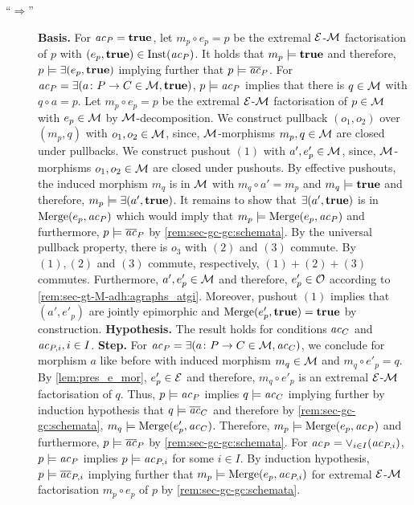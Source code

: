 \begin{description}
    \item[``$\Rightarrow$''] \textbf{Basis.}
    For $\mathit{ac}_P=\textbf{true}$, let $m_p \circ e_p=p$ be the extremal $\mathcal{E}$-${\cal M}$ factorisation of $p$ with $(e_p,\textbf{true}) \in \mathrm{Inst}(\mathit{ac}_P)$.
    It holds that $m_p \models \textbf{true}$ and therefore, $p \models \exists(e_p,\textbf{true})$ implying further that $p \models \overline{\mathit{ac}}_P$.
    For $\mathit{ac}_P=\exists(a\colon P \to C \in {\cal M},\textbf{true})$, $p \models \mathit{ac}_P$ implies that there is $q \in {\cal M}$ with $q \circ a=p$.
    Let $m_p \circ e_p=p$ be the extremal $\mathcal{E}$-${\cal M}$ factorisation of $p \in {\cal M}$ with $e_p \in {\cal M}$ by ${\cal M}$-decomposition.
    We construct pullback $(o_1,o_2)$ over $(m_p,q)$ with $o_1,o_2 \in {\cal M}$, since, ${\cal M}$-morphisms $m_p,q \in {\cal M}$ are closed under pullbacks.
    We construct pushout $(1)$ with $a',e'_p \in {\cal M}$, since, ${\cal M}$-morphisms $o_1,o_2 \in {\cal M}$ are closed under pushouts.
    By effective pushouts, the induced morphism $m_q$ is in ${\cal M}$ with $m_q \circ a'=m_p$ and $m_q \models \textbf{true}$ and therefore, $m_p \models \exists(a',\textbf{true})$.
    It remains to show that $\exists(a',\textbf{true})$ is in $\mathrm{Merge}(e_p,\mathit{ac}_P)$ which would imply that $m_p \models \mathrm{Merge}(e_p,\mathit{ac}_P)$ and furthermore, $p \models \overline{\mathit{ac}}_P$ by \cref{rem:sec-gc-gc:schemata}.
    By the universal pullback property, there is $o_3$ with $(2)$ and $(3)$ commute.
    By $(1),(2)$ and $(3)$ commute, respectively, $(1)+(2)+(3)$ commutes.
    Furthermore, $a',e'_p \in {\cal M}$ and therefore, $e'_p \in {\cal O}$ according to \cref{rem:sec-gt-M-adh:agraphs_atgi}.
    Moreover, pushout $(1)$ implies that $(a',e'_p)$ are jointly epimorphic and $\mathrm{Merge}(e'_p,\textbf{true})=\textbf{true}$ by construction.
    \textbf{Hypothesis.}
    The result holds for conditions $\mathit{ac}_C$ and $\mathit{ac}_{P,i},i \in I$.
    \textbf{Step.}
    For $\mathit{ac}_P=\exists(a\colon P \to C \in {\cal M},\mathit{ac}_C)$, we conclude for morphism $a$ like before with induced morphism $m_q \in {\cal M}$ and $m_q \circ e'_p=q$.
    By \cref{lem:pres_e_mor}, $e'_p \in \mathcal{E}$ and therefore, $m_q \circ e'_p$ is an extremal $\mathcal{E}$-${\cal M}$ factorisation of $q$.
    Thus, $p \models \mathit{ac}_P$ implies $q \models \mathit{ac}_C$ implying further by induction hypothesis that $q \models \overline{\mathit{ac}}_C$ and therefore by \cref{rem:sec-gc-gc:schemata}, $m_q \models \mathrm{Merge}(e'_p,\mathit{ac}_C)$.
    Therefore, $m_p \models \mathrm{Merge}(e_p,\mathit{ac}_P)$ and furthermore, $p \models \overline{\mathit{ac}}_P$ by \cref{rem:sec-gc-gc:schemata}.
    For $\mathit{ac}_P=\vee_{i \in I}(\mathit{ac}_{P,i})$, $p \models \mathit{ac}_P$ implies $p \models \mathit{ac}_{P,i}$ for some $i \in I$.
    By induction hypothesis, $p \models \overline{\mathit{ac}}_{P,i}$ implying further that $m_p \models \mathrm{Merge}(e_p,\mathit{ac}_{P,i})$ for extremal $\mathcal{E}$-${\cal M}$ factorisation $m_p \circ e_p$ of $p$ by \cref{rem:sec-gc-gc:schemata}.

\end{description}
